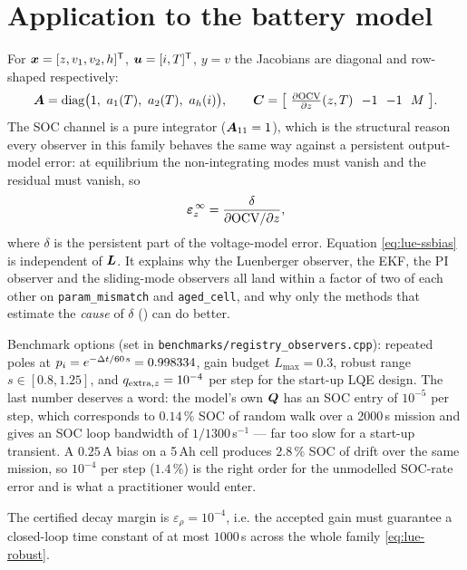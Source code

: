 \section{Application to the battery model}
\label{sec:lue-battery}
For $\bm{x} = [z, v_1, v_2, h]^{\mathsf{T}}$, $\bm{u} = [i,T]^{\mathsf{T}}$, $y = v$ the Jacobians are diagonal and
row-shaped respectively:
\begin{equation}
\mA = \diag\!\big(1,\ a_1(T),\ a_2(T),\ a_h(i)\big), \qquad
\mC = \big[\ \tfrac{\partial\ocv}{\partial \soc}(\soc,T)\ \ {-1}\ \ {-1}\ \ M\ \big].
\label{eq:lue-cellAC}
\end{equation}
The SOC channel is a pure integrator ($\bm{A}_{11}=1$), which is the structural reason every
observer in this family behaves the same way against a persistent output-model error: at
equilibrium the non-integrating modes must vanish and the residual must vanish, so
\begin{equation}
\bm{\varepsilon}_{z}^{\,\infty} = \frac{\delta}{\partial\mathrm{OCV}/\partial z} ,
\label{eq:lue-ssbias}
\end{equation}
where $\delta$ is the persistent part of the voltage-model error.  Equation
\eqref{eq:lue-ssbias} is independent of $\bm{L}$.  It explains why the Luenberger observer, the
EKF, the PI observer and the sliding-mode observers all land within a factor of two of each
other on \texttt{param\_mismatch} and \texttt{aged\_cell}, and why only the methods that estimate
the \emph{cause} of $\delta$ () can do better.

Benchmark options (set in \texttt{benchmarks/registry\_observers.cpp}): repeated poles at
$p_i = e^{-\Delta t/60\,\mathrm{s}} = 0.998334$, gain budget $L_{\max}=0.3$, robust range
$s\in[0.8,1.25]$, and $q_{\text{extra},z}=10^{-4}$ per step for the start-up LQE design.  The
last number deserves a word: the model's own $\bm{Q}$ has an SOC entry of $10^{-5}$ per step, which
corresponds to $0.14\,\%$ SOC of random walk over a 2000\,s mission and gives an SOC loop
bandwidth of $1/1300$\,s$^{-1}$ --- far too slow for a start-up transient.  A $0.25$\,A bias on a
5\,Ah cell produces $2.8\,\%$ SOC of drift over the same mission, so $10^{-4}$ per step
($1.4\,\%$) is the right order for the unmodelled SOC-rate error and is what a practitioner
would enter.

The certified decay margin is $\varepsilon_\rho = 10^{-4}$, i.e. the accepted gain must
guarantee a closed-loop time constant of at most $1000$\,s across the whole family
\eqref{eq:lue-robust}.

